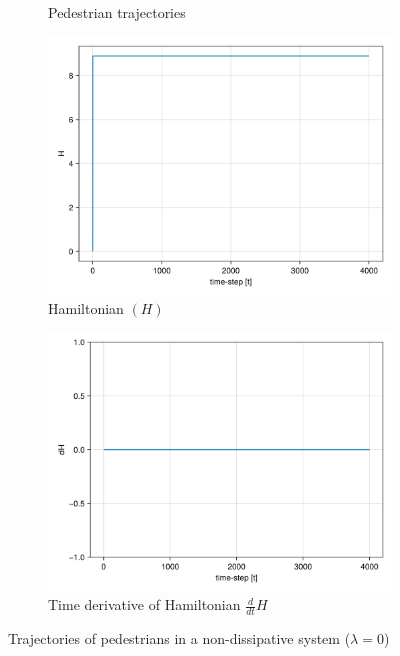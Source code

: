 \begin{itemize}
\begin{figure}[H]
\begin{subfigure}{\textwidth}
        \caption{Pedestrian trajectories}
        \label{plot:nodisp_traj}
    \end{subfigure}
    \begin{subfigure}{.40\textwidth}
        \centering
        \includegraphics[width=\linewidth]{figures/H_no_dissipation.png}
        \caption{Hamiltonian $(H)$}
        \label{plot:nodisp_h}
    \end{subfigure}
    \begin{subfigure}{.40\textwidth}
        \centering
        \includegraphics[width=\linewidth]{figures/dH_no_dissipation.png}
        \caption{Time derivative of Hamiltonian $\frac{d}{dt}H$}
        \label{plot:nodisp_dh}
    \end{subfigure}
    \caption{Trajectories of pedestrians in a non-dissipative system ($\lambda = 0$)}
    \label{plot:nodisp}
\end{figure}


\end{itemize}
